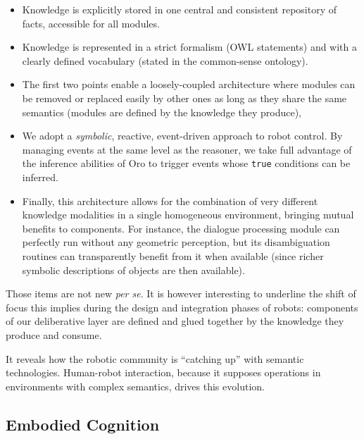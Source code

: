 \documentclass[preprint,3p,times]{elsarticle}
\begin{document}
\begin{itemize}
    
    \item{Knowledge is explicitly stored in one central and consistent
    repository of facts, accessible for all modules.} 

    \item{Knowledge is represented in a strict formalism (OWL statements) and
    with a clearly defined vocabulary (stated in the common-sense ontology).}

    \item{The first two points enable a loosely-coupled architecture where
    modules can be removed or replaced easily by other ones as long as
    they share the same semantics (modules are defined by the knowledge they
    produce),} 

    \item{We adopt a \emph{symbolic}, reactive, event-driven approach to robot control.
    By managing events at the same level as the reasoner, we take full
    advantage of the inference abilities of {\sc Oro} to trigger events whose
    \texttt{true} conditions can be inferred.} 

    \item{Finally, this architecture allows for the combination of very
    different knowledge modalities in a single homogeneous environment,
    bringing mutual benefits to components. For instance, the dialogue
    processing module can perfectly run without any geometric
    perception, but its disambiguation routines can transparently
    benefit from it when available (since richer symbolic descriptions of
    objects are then available).}

\end{itemize}

Those items are not new \emph{per se}. It is however interesting to
underline the shift of focus this implies during the design and integration
phases of robots: components of our deliberative layer are defined and glued together by
the knowledge they produce and consume.

It reveals how the robotic community is ``catching up'' with semantic
technologies. Human-robot interaction, because it supposes operations in
environments with complex semantics, drives this evolution.

\subsection{Embodied Cognition}
\end{document}
